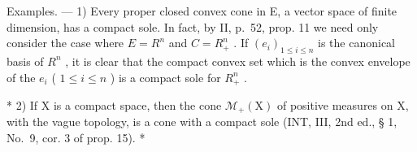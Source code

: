 Examples. --- 1) Every proper closed convex cone in E, a vector space of finite dimension, has a compact sole. In fact, by II, p.~52, prop. 11 we need only consider the case where \(E = R^{n}\) and \(C = R_{+}^{n}\) . If \((e_{i})_{1 \leqslant i \leqslant n}\) is the canonical basis of \(R^{n}\) , it is clear that the compact convex set which is the convex envelope of the \(e_{i}\) ( \(1 \leqslant i \leqslant n\) ) is a compact sole for \(R_{+}^{n}\) .

* 2) If X is a compact space, then the cone \(\mathcal{M}_{+}(\mathrm{X})\) of positive measures on X, with the vague topology, is a cone with a compact sole (INT, III, 2nd ed., § 1, No.~9, cor. 3 of prop. 15). *

